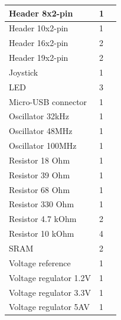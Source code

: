 \begin{table}[H]
\begin{tabular}{| p{3cm} | p{3cm} | p{3cm} |}
        Header 8x2-pin & 1 &\\ \hline
        Header 10x2-pin & 1 &\\ \hline
        Header 16x2-pin & 2 &\\ \hline
        Header 19x2-pin & 2 &\\ \hline
        Joystick & 1 &\\ \hline
        LED & 3 &\\ \hline
        Micro-USB connector & 1 &\\ \hline
        Oscillator 32kHz & 1 &\\ \hline
        Oscillator 48MHz & 1 &\\ \hline
        Oscillator 100MHz & 1 &\\ \hline
        Resistor 18 Ohm & 1 &\\ \hline
        Resistor 39 Ohm & 1 &\\ \hline
        Resistor 68 Ohm & 1 &\\ \hline
        Resistor 330 Ohm & 1 &\\ \hline
        Resistor 4.7 kOhm & 2 &\\ \hline
        Resistor 10 kOhm & 4 &\\ \hline
        SRAM & 2 &\\ \hline
        Voltage reference & 1 &\\ \hline
        Voltage regulator 1.2V & 1 &\\ \hline
        Voltage regulator 3.3V & 1 &\\ \hline
        Voltage regulator 5AV & 1 &\\
        \hline
    \end{tabular}
\end{table}

